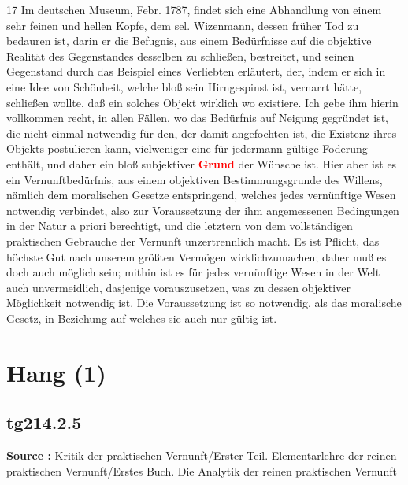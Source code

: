 \documentclass[a4paper,12pt,twoside]{book}
\newcommand{\match}[1]{\textcolor{red}{\textbf{#1}}}
\newcommand{\unnumberedsection}[1]{
	\section*{#1}
	\addcontentsline{toc}{section}{#1}
	\markright{#1}
}
\begin{document}
	17 Im deutschen Museum, Febr. 1787, findet sich eine Abhandlung von einem sehr feinen und hellen Kopfe, dem sel. Wizenmann, dessen früher Tod zu bedauren ist, darin er die Befugnis, aus einem Bedürfnisse auf die objektive Realität des Gegenstandes desselben zu schließen, bestreitet, und seinen Gegenstand durch das Beispiel eines Verliebten erläutert, der, indem er sich in eine Idee von Schönheit, welche bloß sein Hirngespinst ist, vernarrt hätte, schließen wollte, daß ein solches Objekt wirklich wo existiere. Ich gebe ihm hierin vollkommen recht, in allen Fällen, wo das Bedürfnis auf Neigung gegründet ist, die nicht einmal notwendig für den, der damit angefochten ist, die Existenz ihres Objekts postulieren kann, vielweniger eine für jedermann gültige Foderung enthält, und daher ein bloß subjektiver \match{Grund} der Wünsche ist. Hier aber ist es ein Vernunftbedürfnis, aus einem objektiven Bestimmungsgrunde des Willens, nämlich dem moralischen Gesetze entspringend, welches jedes vernünftige Wesen notwendig verbindet, also zur Voraussetzung der ihm angemessenen Bedingungen in der Natur a priori berechtigt, und die letztern von dem vollständigen praktischen Gebrauche der Vernunft unzertrennlich macht. Es ist Pflicht, das höchste Gut nach unserem größten Vermögen wirklichzumachen; daher muß es doch auch möglich sein; mithin ist es für jedes vernünftige Wesen in der Welt auch unvermeidlich, dasjenige vorauszusetzen, was zu dessen objektiver Möglichkeit notwendig ist. Die Voraussetzung ist so notwendig, als das moralische Gesetz, in Beziehung auf welches sie auch nur gültig ist. 
	
	\unnumberedsection{Hang (1)} 
	\subsection*{tg214.2.5} 
	\textbf{Source : }Kritik der praktischen Vernunft/Erster Teil. Elementarlehre der reinen praktischen Vernunft/Erstes Buch. Die Analytik der reinen praktischen Vernunft\\  
	
\end{document}

